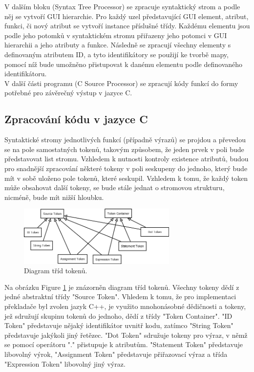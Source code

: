 \documentclass[report,11pt]{elsarticle}
\begin{document}
V dalším bloku (Syntax Tree Processor) se zpracuje syntaktický strom a podle něj se vytvoří GUI hierarchie. Pro každý uzel představující GUI element, atribut, funkci, či nový atribut se vytvoří instance příslušné třídy. Každému elementu jsou podle jeho potomků v syntaktickém stromu přiřazeny jeho potomci v GUI hierarchii a jeho atributy a funkce.
Následně se zpracují všechny elementy s definovaným atributem ID, a tyto identifikátory se použijí ke tvorbě mapy, pomocí níž bude umožněno přistupovat k danému elementu podle definovaného identifikátoru.\\
V další části programu (C Source Processor) se zpracují kódy funkcí do formy potřebné pro závěrečný výstup v jazyce C. 

\subsection{Zpracování kódu v jazyce C}
Syntaktické stromy jednotlivých funkcí (případně výrazů) se projdou a převedou se na pole samostatných tokenů, takovým způsobem, že jeden prvek v poli bude představovat list stromu. Vzhledem k nutnosti kontroly existence atributů, budou pro snadnější zpracování některé tokeny v poli seskupeny do jednoho, který bude mít v sobě uloženo pole tokenů, které seskupil. Vzhledem k tomu, že každý token může obsahovat další tokeny, se bude stále jednat o stromovou strukturu, nicméně, bude mít nižší hloubku.\\
\begin{figure}[!ht]
\begin{center}
  \includegraphics[width=0.7\textwidth]{tokens}
\caption{{\label{fig:fig2}}Diagram tříd tokenů.}
\end{center}
\end{figure}

Na obrázku Figure \ref{fig:fig2} je znázorněn diagram tříd tokenů. Všechny tokeny dědí z jedné abstraktní třídy "Source Token". Vhledem k tomu, že pro implementaci překladače byl zvolen jazyk C++, je využito mnohonásobné dědičnosti a tokeny, jež sdružují skupinu tokenů do jednoho, dědí z třídy "Token Container". "ID Token" představuje nějaký identifikátor uvnitř kodu, zatímco "String Token" představuje jakýkoli jiný řetězec. "Dot Token" sdružuje tokeny pro výraz, v němž se pomocí operátoru "." přistupuje k atributům. "Statement Token" představuje libovolný výrok, "Assignment Token" představuje přiřazovací výraz a třída "Expression Token" libovolný jiný výraz.
\end{document}
